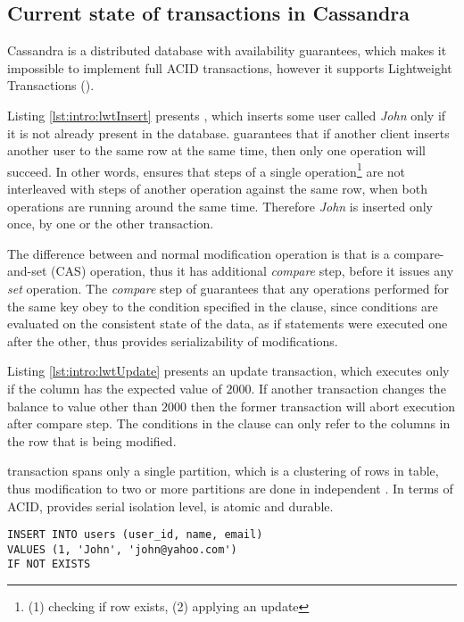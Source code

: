 \subsection{Current state of transactions in Cassandra}	
Cassandra is a distributed database with availability guarantees, which makes it impossible to implement full ACID transactions, however it supports Lightweight Transactions (\lwt).

Listing \ref{lst:intro:lwtInsert} presents \lwt, which inserts some user called \emph{John} only if it is not already present in the database. \lwt  guarantees that if another client inserts another user to the same row at the same time, then only one operation will succeed. In other words, \lwt ensures that steps of a single operation\footnote{(1) checking if row exists, (2) applying an update} are not interleaved with steps of another operation against the same row, when both operations are running around the same time. Therefore \emph{John} is inserted only once, by one or the other transaction.

The difference between \lwt and normal modification operation is that \lwt is a compare-and-set (CAS) operation, thus it has additional \emph{compare} step, before it issues any \emph{set} operation.
The \emph{compare} step of \lwt guarantees that any operations performed for the same key obey to the condition specified in the  clause, since conditions are evaluated on the consistent state of the data, as if statements were executed one after the other, thus provides serializability of modifications.

Listing \ref{lst:intro:lwtUpdate} presents an update transaction, which executes only if the  column has the expected value of $2000$. If another transaction changes the balance to value other than $2000$ then the former transaction will abort execution after compare step. The conditions in the  clause can only refer to the columns in the row that is being modified.

\lwt transaction spans only a single partition, which is a clustering of rows in  table, thus modification to two or more partitions are done in independent \lwt. In terms of ACID, \lwt provides serial isolation level, is atomic and durable. 

\begin{example}
\label{lst:intro:lwtInsert}
\begin{lstlisting}[style=outcode,caption={LWT Insert with \code{IF NOT EXISTS} clause}]
INSERT INTO users (user_id, name, email)  
VALUES (1, 'John', 'john@yahoo.com') 
IF NOT EXISTS
\end{lstlisting}
\end{example}

